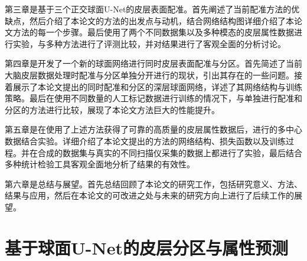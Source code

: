 第三章是基于三个正交球面U-Net的皮层表面配准。首先阐述了当前配准方法的优缺点，然后介绍了本论文的方法的出发点与动机，结合网络结构图详细介绍了本论文方法的每一个步骤。最后使用了两个不同数据集以及多种模态的皮层属性数据进行实验，与多种方法进行了评测比较，并对结果进行了客观全面的分析讨论。

第四章是开发了一个新的球面网络进行同时皮层表面配准与分区。首先简述了当前大脑皮层数据处理时配准与分区单独分开进行的现状，引出其存在的一些问题。接着展示了本论文提出的同时配准和分区的深层球面网络，详述了其网络结构与训练策略。最后在使用不同数量的人工标记数据进行训练的情况下，与单独进行配准和分区的方法进行比较，展现了本论文方法巨大的性能提升。

第五章是在使用了上述方法获得了可靠的高质量的皮层属性数据后，进行的多中心数据结合实验。详细介绍了本论文提出的方法的网络结构、损失函数以及训练过程。并在合成的数据集与真实的不同扫描仪采集的数据上都进行了实验，最后结合多种统计检验工具客观全面地分析了结果的有效性。

第六章是总结与展望。首先总结回顾了本论文的研究工作，包括研究意义、方法、结果与应用，然后在本论文的可改进之处与未来的研究方向上进行了后续工作的展望。





\chapter{基于球面U-Net的皮层分区与属性预测}\label{sec:基于球面U-Net的皮层分区与属性预测}

